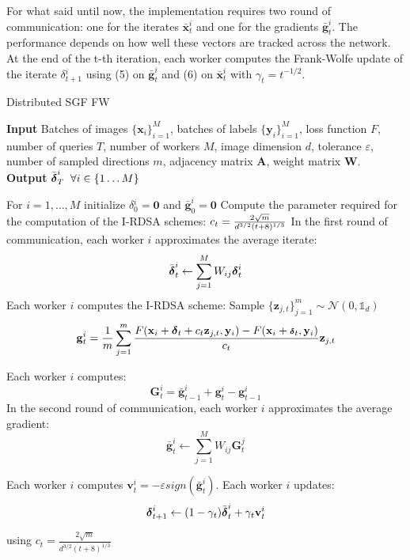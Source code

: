 For what said until now, the implementation requires two round of communication: one for the iterates $\bar{\mathbf{x}}_t^i$ and one for the gradients $\bar{\mathbf{g}}_t^i$. The performance depends on how well these vectors are tracked across the network.\\
At the end of the t-th iteration, each worker computes the Frank-Wolfe update of the iterate \mbox{\boldmath$ \delta$}$_{t+1}^i$ using (5) on $\bar{\mathbf{g}}_t^i$ and (6) on $\bar{\mathbf{x}}_t^i$ with $\gamma_t = t^{-1/2}$.\\
\begin{algorithm}
	\caption{Distributed SGF FW}\label{distributed}
	\textbf{Input} Batches of images $\{\mathbf{x}_i\}_{i=1}^M$, batches of labels $\{\mathbf{y}_i\}_{i=1}^M$, loss function $F$, number of queries $T$, number of workers $M$, image dimension $d$, tolerance $\varepsilon$, number of sampled directions $m$, adjacency matrix $\mathbf{A}$, weight matrix $\mathbf{W}$.\\
	\textbf{Output} $\bar{\mbox{\boldmath$ \delta$}}_T^i\;\;\forall i \in \{1\dots M\}$
	\begin{algorithmic}[1]		
		\State For $i=1,\dots, M$ initialize \mbox{\boldmath$ \delta$}$_0^i =\mathbf{0} $ and $\bar{\mathbf{g}}_0^i = \mathbf{0}$
		\State Compute the parameter required for the computation of the I-RDSA schemes: 
		${\scriptsize c_t =\frac{2\sqrt{m}}{d^{3/2}(t+8)^{1/3}}}$
		\State In the first round of communication, each worker $i$ approximates the average iterate: \newline
		\[\bar{\mbox{\boldmath$ \delta$}}_t^i \leftarrow \sum_{j=1}^{M} W_{ij}\mbox{\boldmath$ \delta$}_t^i\]
		\State Each worker $i$ computes the I-RDSA scheme:\newline 
		Sample $\{\mathbf{z}_{j,t}\}_{j=1}^m \sim\mathcal{N}(0,\mathbb{1}_d)$ \newline
		\[\mathbf{g}_t^i = \frac{1}{m} \sum_{j=1}^{m} \frac{F(\mathbf{x}_i + \mbox{\boldmath$ \delta$}_t + c_t\mathbf{z}_{j,t}, \mathbf{y}_i) - F(\mathbf{x}_i + \mbox{\scriptsize\boldmath$ \delta$}_t, \mathbf{y}_i)}{c_t}\mathbf{z}_{j,t}\]
		
		\State  Each worker $i$ computes:
		\[ \mathbf{G}_t^i = \bar{\mathbf{g}}_{t-1}^i + \mathbf{g}_t^i - \mathbf{g}_{t-1}^i \]
		\State In the second round of communication, each worker $i$ approximates the average gradient:
		\[ \bar{\mathbf{g}}_t^i \leftarrow \sum_{j=1}^{M} W_{ij}\mathbf{G}_t^j  \]
		
		\State Each worker $i$ computes $\mathbf{v}_t^i = - \varepsilon sign(\bar{\mathbf{g}}^i_t)$.
		\State Each worker $i$ updates:
		\[\mbox{\boldmath$ \delta$}_{t+1}^i \leftarrow (1-\gamma_t)\bar{\mbox{\boldmath$ \delta$}}_t^i + \gamma_t\mathbf{v}_t^i\]
		\EndFor
		
	\end{algorithmic}
\end{algorithm}
 using $c_t = \frac{2\sqrt{m}}{d^{3/2}(t+8)^{1/3}}$